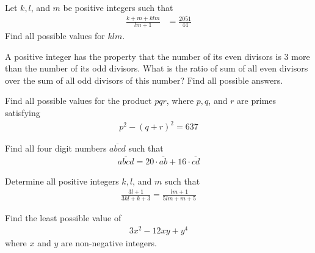 \documentclass[problems.tex]{subfile}
\begin{document}
	\begin{problem}
		Let $k, l$, and $m$ be positive integers such that
		\begin{align*}
			\frac{k+m+klm}{lm+1} &= \frac{2051}{44}
		\end{align*}
		Find all possible values for $klm$.
	\end{problem}

	\begin{problem}
		A positive integer has the property that the number of its even divisors is $3$ more than the number of its odd divisors. What is the ratio of sum of all even divisors over the sum of all odd divisors of this number? Find all possible answers.
	\end{problem}

	\begin{problem}
		Find all possible values for the product $pqr$, where $p, q$, and $r$ are primes satisfying
		\begin{align*}
			p^2 - (q+r)^2 = 637
		\end{align*}
	\end{problem}

	\begin{problem}
		Find all four digit numbers $\overline{abcd}$ such that
		\begin{align*}
			\overline{abcd} = 20 \cdot \overline{ab} + 16 \cdot \overline{cd}
		\end{align*}
	\end{problem}

	\begin{problem}
		Determine all positive integers $k,l$, and $m$ such that
			\begin{align*}
				\frac{3l+1}{3kl+k+3} = \frac{lm + 1}{5lm+m+5}
			\end{align*}
	\end{problem}

	\begin{problem}
		Find the least possible value of
			\begin{align*}
				3x^2 - 12xy + y^4
			\end{align*}
		where $x$ and $y$ are non-negative integers.
	\end{problem}
\end{document}
